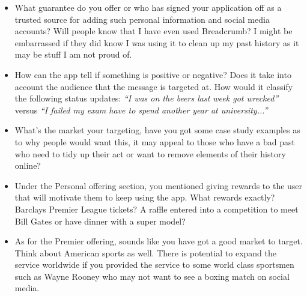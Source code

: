 	      \begin{itemize}
        \item What guarantee do you offer or who has signed your application off as a trusted source for adding such personal information and social media accounts? Will people know that I have even used Breadcrumb? I might be embarrassed if they did know I was using it to clean up my past history as it may be stuff I am not proud of.
        \item How can the app tell if something is positive or negative? Does it take into account the audience that the message is targeted at. How would it classify the following status updates: \emph{``I was on the beers last week got wrecked''} versus \emph{``I failed my exam have to spend another year at university...''}
        \item What’s the market your targeting, have you got some case study examples as to why people would want this, it may appeal to those who have a bad past who need to tidy up their act or want to remove elements of their history online?
        \item Under the Personal offering section, you mentioned giving rewards to the user that will motivate them to keep using the app. What rewards exactly? Barclays Premier League tickets? A raffle entered into a competition to meet Bill Gates or have dinner with a super model?
        \item As for the Premier offering, sounds like you have got a good market to target. Think about American sports as well. There is potential to expand the service worldwide if you provided the service to some world class sportsmen such as Wayne Rooney who may not want to see a boxing match on social media.
      \end{itemize}
